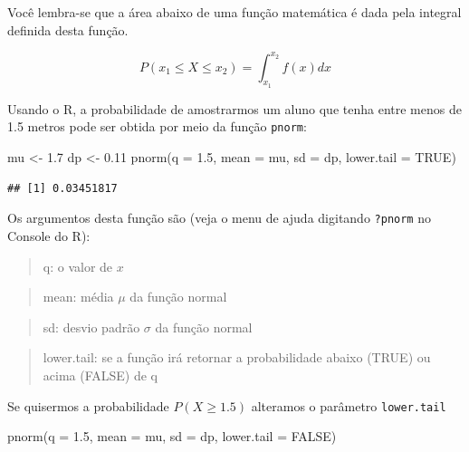 \documentclass[
]{book}
\newenvironment{Shaded}{\begin{snugshade}}{\end{snugshade}}
\newcommand{\AttributeTok}[1]{\textcolor[rgb]{0.77,0.63,0.00}{#1}}
\newcommand{\ConstantTok}[1]{\textcolor[rgb]{0.00,0.00,0.00}{#1}}
\newcommand{\FloatTok}[1]{\textcolor[rgb]{0.00,0.00,0.81}{#1}}
\newcommand{\FunctionTok}[1]{\textcolor[rgb]{0.00,0.00,0.00}{#1}}
\newcommand{\NormalTok}[1]{#1}
\newcommand{\OtherTok}[1]{\textcolor[rgb]{0.56,0.35,0.01}{#1}}
\begin{document}
Você lembra-se que a área abaixo de uma função matemática é dada pela integral definida desta função.

\[P(x_1 \le X \le x_2) = \int_{x_1}^{x_2}f(x) dx\]

Usando o R, a probabilidade de amostrarmos um aluno que tenha entre menos de 1.5 metros pode ser obtida por meio da função \texttt{pnorm}:

\begin{Shaded}
\begin{Highlighting}[]
\NormalTok{mu }\OtherTok{\textless{}{-}} \FloatTok{1.7}
\NormalTok{dp }\OtherTok{\textless{}{-}} \FloatTok{0.11}
\FunctionTok{pnorm}\NormalTok{(}\AttributeTok{q =} \FloatTok{1.5}\NormalTok{, }\AttributeTok{mean =}\NormalTok{ mu, }\AttributeTok{sd =}\NormalTok{ dp, }\AttributeTok{lower.tail =} \ConstantTok{TRUE}\NormalTok{)}
\end{Highlighting}
\end{Shaded}

\begin{verbatim}
## [1] 0.03451817
\end{verbatim}

Os argumentos desta função são (veja o menu de ajuda digitando \texttt{?pnorm} no Console do R):

\begin{quote}
q: o valor de \(x\)
\end{quote}

\begin{quote}
mean: média \(\mu\) da função normal
\end{quote}

\begin{quote}
sd: desvio padrão \(\sigma\) da função normal
\end{quote}

\begin{quote}
lower.tail: se a função irá retornar a probabilidade abaixo (TRUE) ou acima (FALSE) de q
\end{quote}

Se quisermos a probabilidade \(P(X \ge 1.5)\) alteramos o parâmetro \texttt{lower.tail}

\begin{Shaded}
\begin{Highlighting}[]
\FunctionTok{pnorm}\NormalTok{(}\AttributeTok{q =} \FloatTok{1.5}\NormalTok{, }\AttributeTok{mean =}\NormalTok{ mu, }\AttributeTok{sd =}\NormalTok{ dp, }\AttributeTok{lower.tail =} \ConstantTok{FALSE}\NormalTok{)}
\end{Highlighting}
\end{Shaded}
\end{document}

